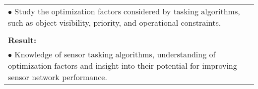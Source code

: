 \begin{table}[!h]
\begin{center}
\begin{tabular}{|p{35mm}||p{55mm}|p{50mm}||p{40mm}|}
      \multicolumn{4}{|p{150mm}|}{$\bullet$ Study the optimization factors considered by tasking algorithms, such as object visibility, priority, and operational constraints.} \\
      \multicolumn{4}{|p{150mm}|}{}                                                                                                                                                                           \\
      \multicolumn{4}{|p{150mm}|}{\textbf{Result:}}                                                                                                                                                       \\
      \multicolumn{4}{|p{150mm}|}{$\bullet$ Knowledge of sensor tasking algorithms, understanding of optimization factors and insight into their potential for improving sensor network performance.}                                                                                                                          \\
      \hline
    \end{tabular}
  \end{center}
\end{table}

\clearpage

